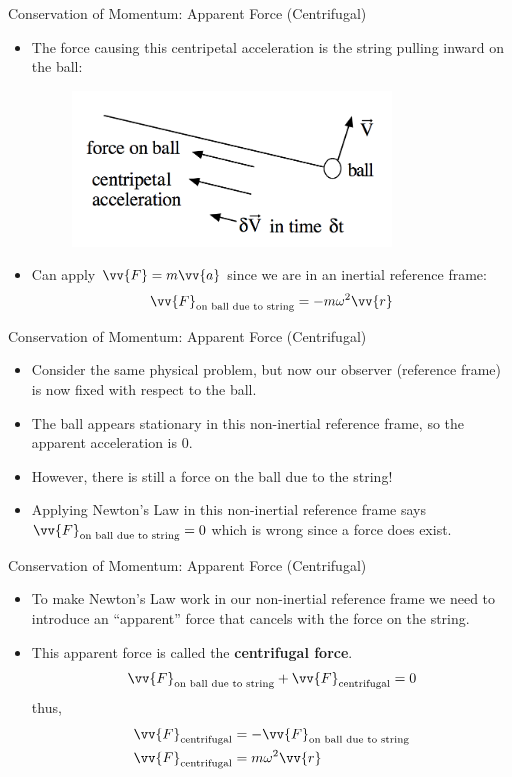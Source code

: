 \begin{frame}{Conservation of Momentum: Apparent Force (Centrifugal)}

\begin{itemize}
	\item The force causing this centripetal acceleration is the string pulling inward on the ball:
	\begin{figure}
		\includegraphics[width=0.8\textwidth]{centrifugal4}	
	\end{figure}
	\item Can apply $\vv{F} = m\vv{a}$ since we are in an inertial reference frame:
	$$\vv{F}_{\text{on ball due to string}} = -m \omega^2 \vv{r}$$
\end{itemize}
\end{frame}
\begin{frame}{Conservation of Momentum: Apparent Force (Centrifugal)}

\begin{itemize}
	\item Consider the same physical problem, but now our observer (reference frame) is now fixed with respect to the ball.
	\item The ball appears stationary in this non-inertial reference frame, so the apparent acceleration is 0.
	\item However, there is still a force on the ball due to the string!
	\item Applying Newton's  Law in this non-inertial reference frame says $\vv{F}_{\text{on ball due to string}} = 0$ which is wrong since a force does exist.
\end{itemize}
\end{frame}
\begin{frame}{Conservation of Momentum: Apparent Force (Centrifugal)}

\begin{itemize}
	\item To make Newton's  Law work in our non-inertial reference frame we need to introduce an ``apparent'' force that cancels with the force on the string.
	\item This apparent force is called the \textbf{centrifugal force}.
	$$\vv{F}_{\text{on ball due to string}} + \vv{F}_{\text{centrifugal}} = 0$$
	thus,
	\begin{align*}
	\vv{F}_{\text{centrifugal}} &= -\vv{F}_{\text{on ball due to string}}\\
	\vv{F}_{\text{centrifugal}} &= m\omega^2\vv{r}
	\end{align*}
\end{itemize}
\end{frame}
